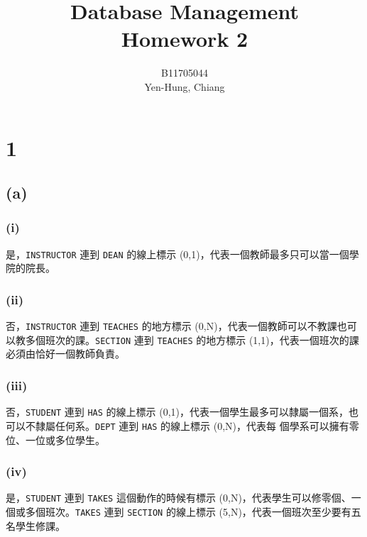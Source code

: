 \documentclass{article}
\title{Database Management\\Homework 2}
\author{B11705044 \\ Yen-Hung, Chiang}
\date{}
\begin{document}
\maketitle

\section*{1}
\subsection*{(a)}
\subsubsection*{(i)}
\begin{adjustwidth}{3em}{}
是，\texttt{INSTRUCTOR} 連到 \texttt{DEAN} 的線上標示 (0,1)，代表一個教師最多只可以當一個學院的院長。
\end{adjustwidth}

\subsubsection*{(ii)}
\begin{adjustwidth}{3em}{}
否，\texttt{INSTRUCTOR} 連到 \texttt{TEACHES} 的地方標示 (0,N)，代表一個教師可以不教課也可以教多個班次的課。\texttt{SECTION} 連到 \texttt{TEACHES} 的地方標示 (1,1)，代表一個班次的課必須由恰好一個教師負責。
\end{adjustwidth}

\subsubsection*{(iii)}
\begin{adjustwidth}{3em}{}
否，\texttt{STUDENT} 連到 \texttt{HAS} 的線上標示 (0,1)，代表一個學生最多可以隸屬一個系，也可以不隸屬任何系。\texttt{DEPT} 連到 \texttt{HAS} 的線上標示 (0,N)，代表每
個學系可以擁有零位、一位或多位學生。
\end{adjustwidth}

\subsubsection*{(iv)}
\begin{adjustwidth}{3em}{}
是，\texttt{STUDENT} 連到 \texttt{TAKES} 這個動作的時候有標示 (0,N)，代表學生可以修零個、一個或多個班次。\texttt{TAKES} 連到 \texttt{SECTION} 的線上標示 (5,N)，代表一個班次至少要有五名學生修課。
\end{adjustwidth}
\end{document}

